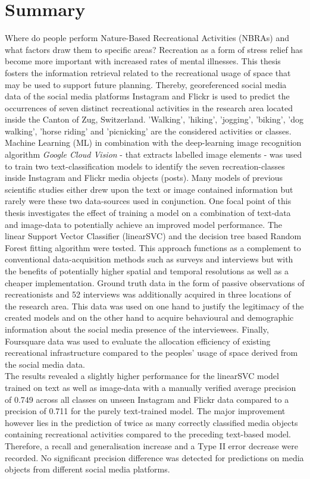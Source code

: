 \chapter*{Summary}
Where do people perform Nature-Based Recreational Activities (NBRAs) and what factors draw them to specific areas? Recreation as a form of stress relief has become more important with increased rates of mental illnesses. This thesis fosters the information retrieval related to the recreational usage of space that may be used to support future planning. Thereby, georeferenced social media data of the social media platforms Instagram and Flickr is used to predict the occurrences of seven distinct recreational activities in the research area located inside the Canton of Zug, Switzerland. 'Walking', 'hiking', 'jogging', 'biking', 'dog walking', 'horse riding' and 'picnicking' are the considered activities or classes. \\
Machine Learning (ML) in combination with the deep-learning image recognition algorithm \textit{Google Cloud Vision} - that extracts labelled image elements - was used to train two text-classification models to identify the seven recreation-classes inside Instagram and Flickr media objects (posts). Many models of previous scientific studies either drew upon the text or image contained information but rarely were these two data-sources used in conjunction. One focal point of this thesis investigates the effect of training a model on a combination of text-data and image-data to potentially achieve an improved model performance. The linear Support Vector Classifier (linearSVC) and the decision tree based Random Forest fitting algorithm were tested. This approach functions as a complement to conventional data-acquisition methods such as surveys and interviews but with the benefits of potentially higher spatial and temporal resolutions as well as a cheaper implementation. Ground truth data in the form of passive observations of recreationists and 52 interviews was additionally acquired in three locations of the research area. This data was used on one hand to justify the legitimacy of the created models and on the other hand to acquire behavioural and demographic information about the social media presence of the interviewees. Finally, Foursquare data was used to evaluate the allocation efficiency of existing recreational infrastructure compared to the peoples' usage of space derived from the social media data.\\
The results revealed a slightly higher performance for the linearSVC model trained on text as well as image-data with a manually verified average precision of 0.749 across all classes on unseen Instagram and Flickr data compared to a precision of 0.711 for the purely text-trained model. The major improvement however lies in the prediction of twice as many correctly classified media objects containing recreational activities compared to the preceding text-based model. Therefore, a recall and generalisation increase and a Type II error decrease were recorded. No significant precision difference was detected for predictions on media objects from different social media platforms.
